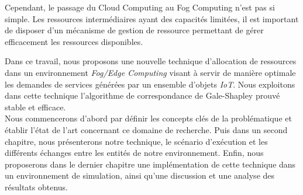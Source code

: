 Cependant, le passage du Cloud Computing au Fog Computing n’est pas si simple. Les ressources
intermédiaires ayant des capacités limitées, il est important de disposer d'un mécanisme de gestion de ressource permettant de gérer efficacement les ressources disponibles.
\par
Dans ce travail, nous proposons une nouvelle technique d'allocation de ressources dans un environnement \emph{Fog/Edge Computing} visant à servir de manière optimale les demandes de services générées par un ensemble d'objets \emph{IoT}. Nous exploitons dans cette technique l'algorithme de correspondance de Gale-Shapley prouvé stable et efficace.\\
Nous commencerons d'abord par définir les concepts clés de la problématique et établir l'état de l'art concernant ce domaine de recherche. Puis dans un second chapitre, nous présenterons notre technique, le scénario d'exécution et les différents échanges entre les entités de notre environnement. Enfin, nous proposerons dans le dernier chapitre une implémentation de cette technique dans un environnement de simulation, ainsi qu'une discussion et une analyse des résultats obtenus.